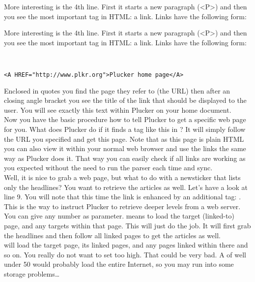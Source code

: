 \begin{latexonly}
More interesting is the 4th line. First it starts a new paragraph
(\textless P\textgreater) and then you see the most important tag in 
HTML: a link. Links have the following form:
\end{latexonly}
\begin{htmlonly}
More interesting is the 4th line. First it starts a new paragraph
(<P>) and then you see the most important tag in HTML: a link. Links 
have the following form:
\end{htmlonly}\\

\begin{verbatim}
<A HREF="http://www.plkr.org">Plucker home page</A>
\end{verbatim}

Enclosed in quotes you find the page they refer to (the URL) then
after an closing angle bracket you see the title of the link that
should be displayed to the user. You will see exactly this text within
Plucker on your home document.\\

Now you have the basic procedure how to tell Plucker to get a specific
web page for you. What does Plucker do if it finds a tag like this in
? It will simply follow the URL you specified and get
this page. Note that as this page is plain HTML you can also view it
within your normal web browser and use the links the same way as
Plucker does it. That way you can easily check if all links are
working as you expected without the need to run the parser each time
and sync.\\

Well, it is nice to grab a web page, but what to do with a newsticker
that lists only the headlines? You want to retrieve the articles as 
well. Let's have a look at line 9. You will note that this
time the link is enhanced by an additional tag: . This
is the way to instruct Plucker to retrieve deeper levels from a
web server. You can give  any number as parameter.
 means to load the target (linked-to) page, and any
targets within that page. This will just do the job. It will first
grab the headlines and then follow all linked pages to get the articles
as well.\\

 will load the target page, its linked pages, and any
pages linked within there and so on. You really do not want to set
 too high.  That could be very bad. A 
of well under 50 would probably load the entire Internet, so you may
run into some storage problems\ldots\\

